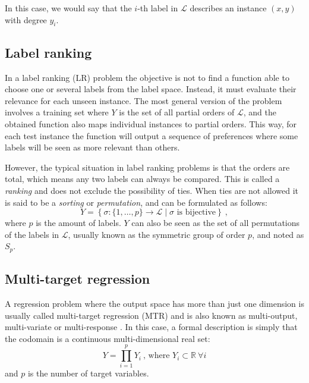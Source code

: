 \documentclass[
	fontsize=11pt, %
	twoside=false, %
	open=any, %
	secnumdepth=1, %
]{kaobook}
\begin{document}
In this case, we would say that the $i$-th label in $\mathcal L$ describes an instance $(x, y)$ with degree $y_i$.

\subsection{Label ranking}

In a label ranking (LR) problem \cite{lrankpairwise,lranksurvey} the objective is not to find a function able to choose one or several labels from the label space. Instead, it must evaluate their relevance for each unseen instance. The most general version of the problem involves a training set where $Y$ is the set of all partial orders of $\mathcal L$, and the obtained function also maps individual instances to partial orders. This way, for each test instance the function will output a sequence of preferences where some labels will be seen as more relevant than others. 

However, the typical situation in label ranking problems is that the orders are total, which means any two labels can always be compared. This is called a \emph{ranking} and does not exclude the possibility of ties. When ties are not allowed it is said to be a \emph{sorting} or \emph{permutation}, and can be formulated as follows:
\begin{equation}
Y=\left\{\sigma:\{1,\dots,p\}\rightarrow \mathcal L\mid\sigma\mbox{ is bijective}\right\}~,
\end{equation}
where $p$ is the amount of labels. $Y$ can also be seen as the set of all permutations of the labels in $\mathcal L$, usually known as the symmetric group of order $p$, and noted as $S_p$. 

\subsection{Multi-target regression}
\label{sec:mtarget}

A regression problem where the output space has more than just one dimension is usually called multi-target regression (MTR) and is also known as multi-output, multi-variate or multi-response \cite{moutr}. In this case, a formal description is simply that the codomain is a continuous multi-dimensional real set:
\begin{equation}
  Y=\prod_{i=1}^p Y_i~\mbox{, where }Y_i\subset\mathbb R~\forall i
  \end{equation}
and $p$ is the number of target variables.
\end{document}
